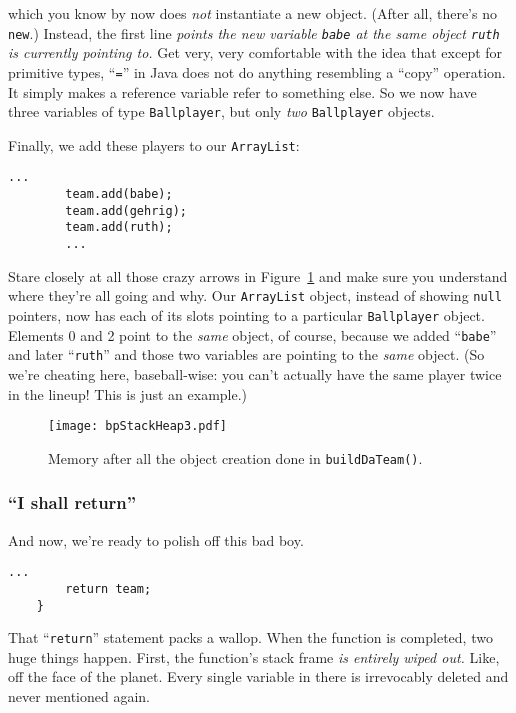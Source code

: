 which you know by now does \textit{not} instantiate a new object. (After all,
there's no \texttt{new}.) Instead, the first line \textit{points the new
variable \texttt{babe} at the same object \texttt{ruth} is currently pointing
to.} Get very, very comfortable with the idea that except for primitive types,
``\texttt{=}'' in Java does not do anything resembling a ``copy'' operation. It
simply makes a reference variable refer to something else. So we now have
three variables of type \texttt{Ballplayer}, but only \textit{two}
\texttt{Ballplayer} objects.

Finally, we add these players to our \texttt{ArrayList}:

\begin{Verbatim}[fontsize=\scriptsize,samepage=true,frame=single]
        ...
        team.add(babe);
        team.add(gehrig);
        team.add(ruth);
        ...
\end{Verbatim}

Stare closely at all those crazy arrows in Figure~\ref{fig:bpStackHeap3} and
make sure you understand where they're all going and why. Our
\texttt{ArrayList} object, instead of showing \texttt{null} pointers, now has
each of its slots pointing to a particular \texttt{Ballplayer} object.
Elements 0 and 2 point to the \textit{same} object, of course, because we
added ``\texttt{babe}'' and later ``\texttt{ruth}'' and those two variables are
pointing to the \textit{same} object. (So we're cheating here, baseball-wise:
you can't actually have the same player twice in the lineup! This is just an
example.)

\begin{figure}   %
\centering
\texttt{[image: bpStackHeap3.pdf]}
\caption{Memory after all the object creation done in \texttt{buildDaTeam()}.}
\label{fig:bpStackHeap3}
\end{figure}

\subsubsection{``I shall return''}

And now, we're ready to polish off this bad boy.

\begin{Verbatim}[fontsize=\scriptsize,samepage=true,frame=single]
        ...
        return team;
    }
\end{Verbatim}

That ``\texttt{return}'' statement packs a wallop. When the function is
completed, two huge things happen. First, the function's stack frame
\textit{is entirely wiped out.} Like, off the face of the planet. Every single
variable in there is irrevocably deleted and never mentioned again.

